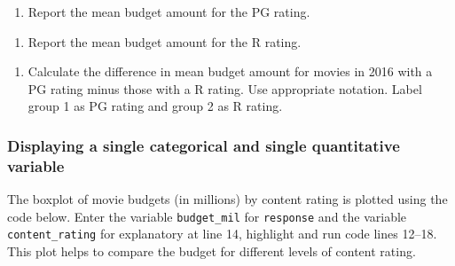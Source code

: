 \documentclass[
]{report}
\providecommand{\tightlist}{%
  \setlength{\itemsep}{0pt}\setlength{\parskip}{0pt}}
\begin{document}
\begin{enumerate}
\def\labelenumi{\arabic{enumi}.}
\setcounter{enumi}{1}
\tightlist
\item
  Report the mean budget amount for the PG rating.
\end{enumerate}

\vspace{0.3in}

\begin{enumerate}
\def\labelenumi{\arabic{enumi}.}
\setcounter{enumi}{2}
\tightlist
\item
  Report the mean budget amount for the R rating.
\end{enumerate}

\vspace{0.3in}

\begin{enumerate}
\def\labelenumi{\arabic{enumi}.}
\setcounter{enumi}{3}
\tightlist
\item
  Calculate the difference in mean budget amount for movies in 2016 with a PG rating minus those with a R rating. Use appropriate notation. Label group 1 as PG rating and group 2 as R rating.
\end{enumerate}

\vspace{0.8in}

\hypertarget{displaying-a-single-categorical-and-single-quantitative-variable}{%
\subsubsection*{Displaying a single categorical and single quantitative variable}\label{displaying-a-single-categorical-and-single-quantitative-variable}}

The boxplot of movie budgets (in millions) by content rating is plotted using the code below. Enter the variable \texttt{budget\_mil} for \texttt{response} and the variable \texttt{content\_rating} for explanatory at line 14, highlight and run code lines 12--18. This plot helps to compare the budget for different levels of content rating.
\end{document}
